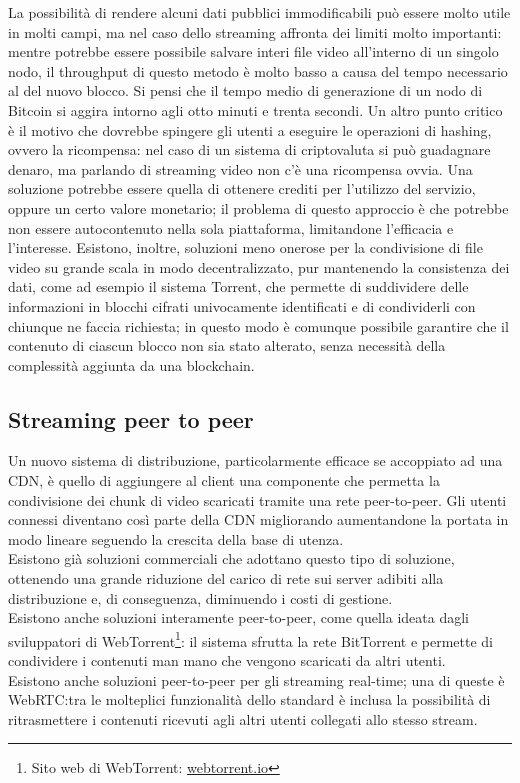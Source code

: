 	La possibilità di rendere alcuni dati pubblici immodificabili può essere molto utile in molti campi, ma nel caso dello streaming affronta dei limiti molto importanti: mentre potrebbe essere possibile salvare interi file video all'interno di un singolo nodo, il throughput di questo metodo è molto basso a causa del tempo necessario al  del nuovo blocco. Si pensi che il tempo medio di generazione di un nodo di Bitcoin si aggira intorno agli otto minuti e trenta secondi. Un altro punto critico è il motivo che dovrebbe spingere gli utenti a eseguire le operazioni di hashing, ovvero la ricompensa: nel caso di un sistema di criptovaluta si può guadagnare denaro, ma parlando di streaming video non c'è una ricompensa ovvia. Una soluzione potrebbe essere quella di ottenere crediti per l'utilizzo del servizio, oppure un certo valore monetario; il problema di questo approccio è che potrebbe non essere autocontenuto nella sola piattaforma, limitandone l'efficacia e l'interesse. Esistono, inoltre, soluzioni meno onerose per la condivisione di file video su grande scala in modo decentralizzato, pur mantenendo la consistenza dei dati, come ad esempio il sistema Torrent, che permette di suddividere delle informazioni in blocchi cifrati univocamente identificati e di condividerli con chiunque ne faccia richiesta; in questo modo è comunque possibile garantire che il contenuto di ciascun blocco non sia stato alterato, senza necessità della complessità aggiunta da una blockchain.

	\subsection{Streaming peer to peer}
	Un nuovo sistema di distribuzione, particolarmente efficace se accoppiato ad una CDN, è quello di aggiungere al client una componente che permetta la condivisione dei chunk di video scaricati tramite una rete peer-to-peer. Gli utenti connessi diventano così parte della CDN migliorando aumentandone la portata in modo lineare seguendo la crescita della base di utenza.
	\\
	Esistono già soluzioni commerciali che adottano questo tipo di soluzione, ottenendo una grande riduzione del carico di rete sui server adibiti alla distribuzione e, di conseguenza, diminuendo i costi di gestione.
	\\
	Esistono anche soluzioni interamente peer-to-peer, come quella ideata dagli sviluppatori di WebTorrent\footnote{Sito web di WebTorrent: \href{https://webtorrent.io/}{webtorrent.io}}: il sistema sfrutta la rete BitTorrent e permette di condividere i contenuti man mano che vengono scaricati da altri utenti.
	\\
	Esistono anche soluzioni peer-to-peer per gli streaming real-time; una di queste è WebRTC:\@ tra le molteplici funzionalità dello standard è inclusa la possibilità di ritrasmettere i contenuti ricevuti agli altri utenti collegati allo stesso stream.

